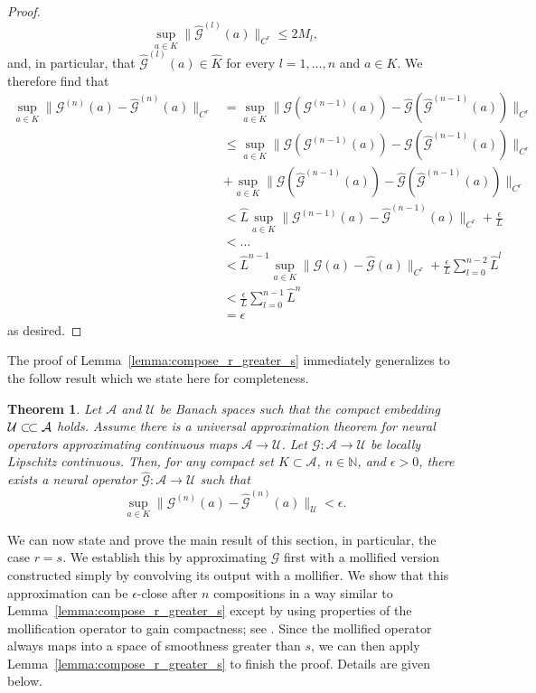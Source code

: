 \documentclass[preprint,11pt]{elsarticle}
\newtheorem{theorem}{Theorem}
\theoremstyle{plain}
\newcommand{\N}{\mathbb{N}}
\newcommand{\G}{\mathcal{G}}
\newcommand{\A}{\mathcal{A}}
\newcommand{\U}{\mathcal{U}}
\newcommand{\ssubset}{\subset\joinrel\subset}
\begin{document}
\begin{proof}
    \[\sup_{a \in K} \|\hat{\G}^{(l)}(a)\|_{C^r} \leq 2 M_l,\]
    and, in particular, that $\hat{\G}^{(l)}(a) \in \hat{K}$ for every $l=1,\dots,n$ and $a \in K$.
    We therefore find that
    \begin{align*}
        \sup_{a \in K} \|\G^{(n)}(a) - \hat{\G}^{(n)}(a)\|_{C^r} &= \sup_{a \in K} \|\G (\G^{(n-1)}(a)) - \hat{\G}(\hat{\G}^{(n-1)}(a)) \|_{C^r} \\
        &\leq \sup_{a \in K} \|\G (\G^{(n-1)}(a)) - \G(\hat{\G}^{(n-1)}(a))\|_{C^r} \\
         &+ \sup_{a \in K} \|\G(\hat{\G}^{(n-1)}(a)) - \hat{\G}(\hat{\G}^{(n-1)}(a))\|_{C^r} \\
        &< \hat{L} \sup_{a \in K} \|\G^{(n-1)}(a) - \hat{\G}^{(n-1)}(a)\|_{C^r} + \frac{\epsilon}{L} \\
        &< \dots \\
        &< \hat{L}^{n-1} \sup_{a \in K} \|\G(a) - \hat{\G}(a)\|_{C^r} + \frac{\epsilon}{L} \sum_{l=0}^{n-2} \hat{L}^l \\
        &< \frac{\epsilon}{L} \sum_{l=0}^{n-1} \hat{L}^n \\
        &= \epsilon
    \end{align*}
    as desired.
\end{proof}

The proof of Lemma~\ref{lemma:compose_r_greater_s} immediately generalizes to the follow result which we state here for completeness.

\begin{theorem}
    Let $\A$ and $\U$ be Banach spaces such that the compact embedding $\U \ssubset \A$ holds. Assume there is a universal approximation theorem
    for neural operators approximating continuous maps $\A \to \U$. Let $\G : \A \to \U$ be locally Lipschitz continuous. Then, for any compact set $K \subset \A$, $n \in \N$, and $\epsilon > 0$, there exists a neural operator $\hat{\G} : \A \to \U$ such that
    \[\sup_{a \in K} \|\G^{(n)}(a) - \hat{\G}^{(n)}(a) \|_{\U} < \epsilon.\]
\end{theorem}

We can now state and prove the main result of this section, in particular, the case $r=s$. We establish this by approximating $\G$ first with a mollified version constructed simply by convolving its output with a mollifier. We show that this approximation can be $\epsilon$-close after $n$ compositions in a way similar to Lemma~\ref{lemma:compose_r_greater_s} except by using properties of the mollification operator to gain compactness; see \cite[Appendix A]{lanthaler2023nonlocality}. Since the mollified operator always maps into a space of smoothness greater than $s$, we can then apply Lemma~\ref{lemma:compose_r_greater_s} to finish the proof. Details are given below.
\end{document}
